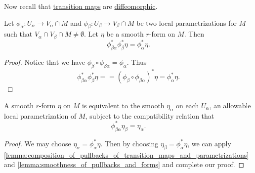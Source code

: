 \documentclass[notoc,notitlepage]{tufte-book}
\begin{document}
Now recall that \hyperref[defn:transition_map]{transition maps} are
\hyperref[propo:transition_maps_are_diffeomorphisms]{diffeomorphic}.

\begin{lemma}\label{lemma:composition_of_pullbacks_of_transition_maps_and_parametrizations}
  Let $\phi_\alpha : U_\alpha \to V_\alpha \cap M$ and $\phi_\beta : U_\beta \to
  V_\beta \cap M$ be two local parametrizations for $M$ such that $V_\alpha \cap
  V_\beta \cap M \neq \emptyset$. Let $\eta$ be a smooth $r$-form on $M$. Then
  \begin{equation}\label{eq:composition_of_pullbacks_of_transition_maps_and_parametrizations}
    \phi^*_{\beta \alpha} \phi_\beta^* \eta = \phi_\alpha^* \eta.
  \end{equation}
\end{lemma}

\begin{proof}
  Notice that we have $\phi_\beta \circ \phi_{\beta \alpha} = \phi_\alpha$. Thus
  \begin{equation*}
    \phi^*_{\beta \alpha} \phi_\beta^* \eta = = \left( \phi_\beta \circ
    \phi_{\beta \alpha} \right)^* \eta = \phi_\alpha^* \eta.
  \end{equation*}
\end{proof}

\begin{crly}\label{crly:_r_forms_on_a_submanifold_and_its_parametrizations_are_equivalent}
  A smooth $r$-form $\eta$ on $M$ is equivalent to the smooth $\eta_\alpha$ on
  each $U_\alpha$, an allowable local parametrization of $M$, subject to the
  compatibility relation that
  \begin{equation*}
    \phi_{\beta\alpha}^* \eta_\beta = \eta_\alpha.
  \end{equation*}
\end{crly}

\begin{proof}
  We may choose $\eta_\alpha = \phi_\alpha^* \eta$. Then by choosing $\eta_\beta
  = \phi_\alpha^* \eta$, we can apply
  \cref{lemma:composition_of_pullbacks_of_transition_maps_and_parametrizations}
  and \cref{lemma:smoothness_of_pullbacks_and_forms} and complete our proof.
\end{proof}
\end{document}

